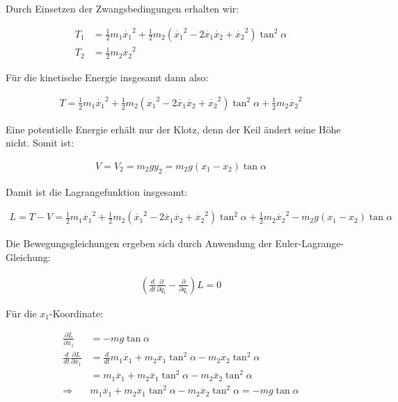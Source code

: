 \documentclass[a4paper,german,12pt,smallheadings]{scrartcl}
\begin{document}
Durch Einsetzen der Zwangsbedingungen erhalten wir:

\begin{align*}
  T_1 &= \frac{1}{2}m_1\dot{x_1}^2 + \frac{1}{2}m_2 (\dot{x_1}^2 - 2\dot{x_1}\dot{x_2}+\dot{x_2}^2) \tan^2 \alpha \\
  T_2 &= \frac{1}{2} m_2 \dot{x_2}^2
\end{align*}

Für die kinetische Energie insgesamt dann also:

\begin{align*}
  T = \frac{1}{2}m_1\dot{x_1}^2 + \frac{1}{2}m_2 (\dot{x_1}^2 - 2\dot{x_1}\dot{x_2}+\dot{x_2}^2) \tan^2 \alpha + \frac{1}{2} m_2 \dot{x_2}^2
\end{align*}

Eine potentielle Energie erhält nur der Klotz, denn der Keil ändert seine Höhe nicht. Somit ist:

\begin{align*}
  V = V_2 = m_2gy_2 = m_2g (x_1 - x_2) \tan \alpha
\end{align*}

Damit ist die Lagrangefunktion insgesamt:

\begin{align*}
  L = T -V = \frac{1}{2}m_1\dot{x_1}^2 + \frac{1}{2} m_2 (\dot{x_1}^2 - 2\dot{x_1}\dot{x_2}+\dot{x_2}^2) \tan^2 \alpha + \frac{1}{2} m_2 \dot{x_2}^2 - m_2g (x_1 - x_2) \tan \alpha
\end{align*}

Die Bewegungsgleichungen ergeben sich durch Anwendung der Euler-Lagrange-Gleichung:

\begin{align*}
  \left(\frac{d}{dt}\frac{\partial}{\partial \dot{q_i}} - \frac{\partial}{\partial q_i}\right) L = 0
\end{align*}

Für die $x_1$-Koordinate:

\begin{align*}
  \frac{\partial L}{\partial x_1} &= -mg \tan \alpha \\
  \frac{d}{dt}\frac{\partial L}{\partial \dot{x_1}} &= \frac{d}{dt} m_1 \dot{x_1} + m_2\dot{x_1}\tan^2 \alpha - m_2\dot{x_2} \tan^2 \alpha \\
                                                  &= m_1\ddot{x_1} + m_2 \ddot{x_1} \tan^2 \alpha - m_2 \ddot{x_2} \tan^2 \alpha \\
  \Rightarrow\quad &m_1\ddot{x_1} + m_2 \ddot{x_1} \tan^2 \alpha - m_2 \ddot{x_2} \tan^2 \alpha = -mg \tan \alpha
\end{align*}
\end{document}
